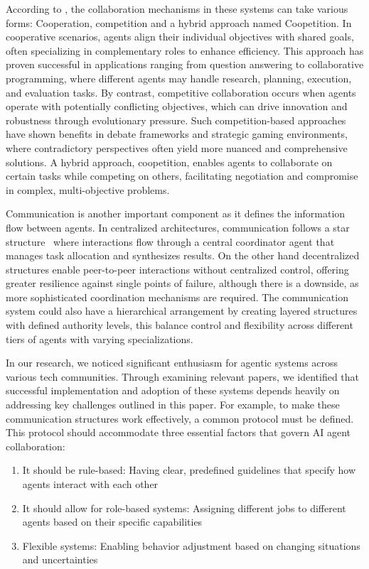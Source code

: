 \documentclass[journal,twoside,10pt]{IEEEtran}
\begin{document}
According to \cite{tran2025multiagent}, the collaboration mechanisms in these systems can take various forms: Cooperation, competition and a hybrid approach named Coopetition. In cooperative scenarios, agents align their individual objectives with shared goals, often specializing in complementary roles to enhance efficiency. This approach has proven successful in applications ranging from question answering to collaborative programming, where different agents may handle research, planning, execution, and evaluation tasks. By contrast, competitive collaboration occurs when agents operate with potentially conflicting objectives, which can drive innovation and robustness through evolutionary pressure. Such competition-based approaches have shown benefits in debate frameworks and strategic gaming environments, where contradictory perspectives often yield more nuanced and comprehensive solutions. A hybrid approach, coopetition, enables agents to collaborate on certain tasks while competing on others, facilitating negotiation and compromise in complex, multi-objective problems.

Communication is another important component as it defines the information flow between agents. In centralized architectures, communication follows a star structure  where interactions flow through a central coordinator agent that manages task allocation and synthesizes results. On the other hand decentralized structures enable peer-to-peer interactions without centralized control, offering greater resilience against single points of failure, although there is a downside, as more sophisticated coordination mechanisms are required. The communication system could also have a hierarchical arrangement by creating layered structures with defined authority levels, this balance control and flexibility across different tiers of agents with varying specializations.

In our research, we noticed significant enthusiasm for agentic systems across various tech communities. Through examining relevant papers, we identified that successful implementation and adoption of these systems depends heavily on addressing key challenges outlined in this paper. For example, to make these communication structures work effectively, a common protocol must be defined. This protocol should accommodate three essential factors that govern AI agent collaboration:

\begin{enumerate}
    \item It should be rule-based: Having clear, predefined guidelines that specify how agents interact with each other
    \item It should allow for role-based systems: Assigning different jobs to different agents based on their specific capabilities
    \item Flexible systems: Enabling behavior adjustment based on changing situations and uncertainties
\end{enumerate}
\end{document}
